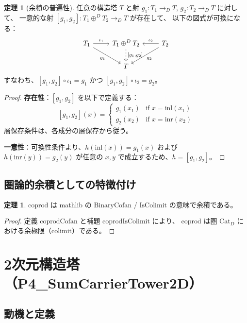 \documentclass[a4paper,11pt]{ltjsarticle}
\theoremstyle{definition}
\newtheorem{theorem}[definition]{定理}
\begin{document}
\begin{theorem}[余積の普遍性]
任意の構造塔 $T$ と射 $g_1 : T_1 \to_D T$, $g_2 : T_2 \to_D T$ に対して、
一意的な射 $[g_1, g_2] : T_1 \oplus^D T_2 \to_D T$ が存在して、
以下の図式が可換になる：
\[
\begin{tikzcd}
T_1 \arrow[r, "\iota_1"] \arrow[rd, "g_1"'] & T_1 \oplus^D T_2 \arrow[d, dashed, "{[g_1, g_2]}"] & T_2 \arrow[l, "\iota_2"'] \arrow[ld, "g_2"] \\
  & T &
\end{tikzcd}
\]
すなわち、$[g_1, g_2] \circ \iota_1 = g_1$ かつ $[g_1, g_2] \circ \iota_2 = g_2$。
\end{theorem}

\begin{proof}
\textbf{存在性}：$[g_1, g_2]$ を以下で定義する：
\[
[g_1, g_2](x) = \begin{cases}
  g_1(x_1) & \text{if } x = \mathrm{inl}(x_1) \\
  g_2(x_2) & \text{if } x = \mathrm{inr}(x_2)
\end{cases}
\]
層保存条件は、各成分の層保存から従う。

\textbf{一意性}：可換性条件より、$h(\mathrm{inl}(x)) = g_1(x)$ および $h(\mathrm{inr}(y)) = g_2(y)$
が任意の $x, y$ で成立するため、$h = [g_1, g_2]$。
\end{proof}

\subsection{圏論的余積としての特徴付け}

\begin{theorem}
$\mathrm{coprod}$ は mathlib の $\mathrm{BinaryCofan}$ / $\mathrm{IsColimit}$ の意味で余積である。
\end{theorem}

\begin{proof}
定義 $\mathrm{coprodCofan}$ と補題 $\mathrm{coprodIsColimit}$ により、
$\mathrm{coprod}$ は圏 $\mathrm{Cat}_D$ における余極限（colimit）である。
\end{proof}

\section{2次元構造塔（P4\_SumCarrierTower2D）}

\subsection{動機と定義}
\end{document}
